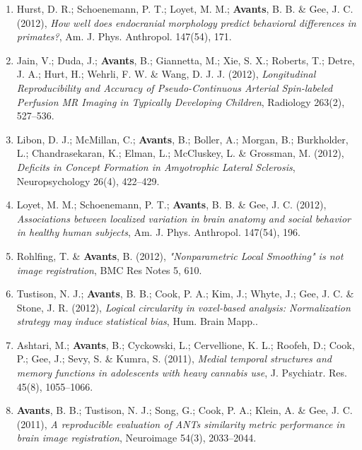 \documentclass[11pt]{moderncv} %
\begin{document}
\begin{enumerate}
\item  Hurst, D. R.; Schoenemann, P. T.; Loyet, M. M.; \textbf{Avants}, B. B. \&  Gee, J. C. (2012), \textit{How well does endocranial morphology predict behavioral differences in primates?}, Am. J. Phys. Anthropol. 147(54), 171.

\item  Jain, V.; Duda, J.; \textbf{Avants}, B.; Giannetta, M.; Xie, S. X.; Roberts, T.; Detre, J. A.; Hurt, H.; Wehrli, F. W. \&  Wang, D. J. J. (2012), \textit{Longitudinal Reproducibility and Accuracy of Pseudo-Continuous Arterial Spin-labeled Perfusion MR Imaging in Typically Developing Children}, Radiology 263(2), 527--536.

\item  Libon, D. J.; McMillan, C.; \textbf{Avants}, B.; Boller, A.; Morgan, B.; Burkholder, L.; Chandrasekaran, K.; Elman, L.; McCluskey, L. \&  Grossman, M. (2012), \textit{Deficits in Concept Formation in Amyotrophic Lateral Sclerosis}, Neuropsychology 26(4), 422--429.

\item  Loyet, M. M.; Schoenemann, P. T.; \textbf{Avants}, B. B. \&  Gee, J. C. (2012), \textit{Associations between localized variation in brain anatomy and social behavior in healthy human subjects}, Am. J. Phys. Anthropol. 147(54), 196.

\item  Rohlfing, T. \&  \textbf{Avants}, B. (2012), \textit{"Nonparametric Local Smoothing" is not image registration}, BMC Res Notes 5, 610.

\item  Tustison, N. J.; \textbf{Avants}, B. B.; Cook, P. A.; Kim, J.; Whyte, J.; Gee, J. C. \&  Stone, J. R. (2012), \textit{Logical circularity in voxel-based analysis: Normalization strategy may induce statistical bias}, Hum. Brain Mapp..

\item  Ashtari, M.; \textbf{Avants}, B.; Cyckowski, L.; Cervellione, K. L.; Roofeh, D.; Cook, P.; Gee, J.; Sevy, S. \&  Kumra, S. (2011), \textit{Medial temporal structures and memory functions in adolescents with heavy cannabis use}, J. Psychiatr. Res. 45(8), 1055--1066.

\item  \textbf{Avants}, B. B.; Tustison, N. J.; Song, G.; Cook, P. A.; Klein, A. \&  Gee, J. C. (2011), \textit{A reproducible evaluation of ANTs similarity metric performance in brain image registration}, Neuroimage 54(3), 2033--2044.


\end{enumerate}
\end{document}
